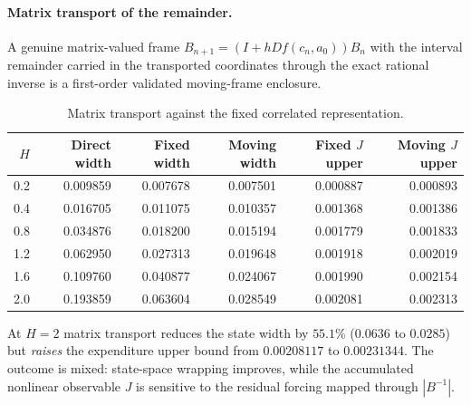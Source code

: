 \documentclass[11pt,notitlepage]{report}
\theoremstyle{definition}
\theoremstyle{remark}
\begin{document}
\paragraph{Matrix transport of the remainder.} A genuine matrix-valued frame $B_{n+1}=(I+hDf(c_n,a_0))B_n$ with the interval remainder carried in the transported coordinates through the exact rational inverse is a first-order validated moving-frame enclosure.
\begin{table}[ht]\centering\small
\caption{Matrix transport against the fixed correlated representation.}
\begin{tabular}{rrrrrr}\toprule
$H$&Direct width&Fixed width&Moving width&Fixed $J$ upper&Moving $J$ upper\\\midrule
0.2&0.009859&0.007678&0.007501&0.000887&0.000893\\
0.4&0.016705&0.011075&0.010357&0.001368&0.001386\\
0.8&0.034876&0.018200&0.015194&0.001779&0.001833\\
1.2&0.062950&0.027313&0.019648&0.001918&0.002019\\
1.6&0.109760&0.040877&0.024067&0.001990&0.002154\\
2.0&0.193859&0.063604&0.028549&0.002081&0.002313\\\bottomrule
\end{tabular}
\end{table}
At $H=2$ matrix transport reduces the state width by $55.1\%$ ($0.0636$ to $0.0285$) but \emph{raises} the expenditure upper bound from $0.00208117$ to $0.00231344$. The outcome is mixed: state-space wrapping improves, while the accumulated nonlinear observable $J$ is sensitive to the residual forcing mapped through $|B^{-1}|$.
\end{document}
